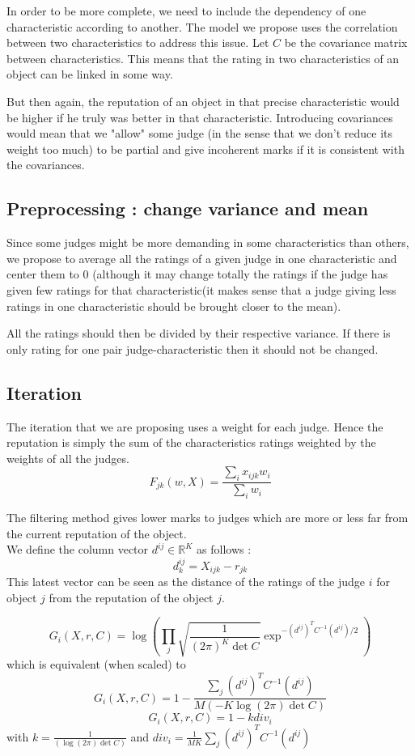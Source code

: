 \documentclass[12pt,a4paper]{article}
\begin{document}
In order to be more complete, we need to include the dependency of one characteristic according to another. The model we propose uses the correlation between two characteristics to address this issue.
Let $C$ be the covariance matrix between characteristics. This means that the rating in two characteristics of an object can be linked in some way.

But then again, the reputation of an object in that precise characteristic would be higher if he truly was better in that characteristic. Introducing covariances would mean that we "allow" some judge (in the sense that we don't reduce its weight too much) to be partial and give incoherent marks if it is consistent with the covariances.

\subsection{Preprocessing : change variance and mean}
Since some judges might be more demanding in some characteristics than others, we propose to average all the ratings of a given judge in one characteristic and center them to $0$ (although it may change totally the ratings if the judge has given few ratings for that characteristic(it makes sense that a judge giving less ratings in one characteristic should be brought closer to the mean).

All the ratings should then be divided by their respective variance. If there is only rating for one pair judge-characteristic then it should not be changed.

\subsection{Iteration}
The iteration that we are proposing uses a weight for each judge. Hence the reputation is simply the sum of the characteristics ratings weighted by the weights of all the judges.
$$F_{jk}(w,X) = \frac{\sum_{i}x_{ijk}w_{i}}{\sum_i w_{i}}$$


The filtering method gives lower marks to judges which are more or less far from the current reputation of the object.\\
We define the column vector $d^{ij} \in \mathbb{R}^K$ as follows :
$$ d^{ij}_k = X_{ijk}-r_{jk}$$
This latest vector can be seen as the distance of the ratings of the judge $i$ for object $j$ from the reputation of the object $j$.


$$G_{i}(X,r,C) = \log (\prod_j \sqrt{\frac{1}{(2\pi)^{K}\det C}} \exp^{- (d^{ij})^TC^{-1} (d^{ij})/2})$$
which is equivalent (when scaled) to
$$G_{i}(X,r,C) = 1 - \frac{\sum_j (d^{ij})^TC^{-1}(d^{ij})}{M(-K\log(2\pi ) \det C)}$$
$$G_{i}(X,r,C) = 1 -k div_i$$
with $k= \frac{1}{(\log(2\pi ) \det C)}$ and $div_i =  \frac{1}{MK}\sum_{j} (d^{ij})^T C^{-1} (d^{ij})$\\
\end{document}
